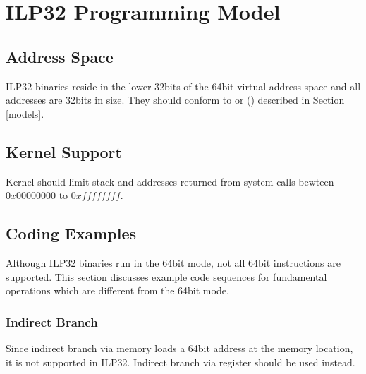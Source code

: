 \chapter{ILP32 Programming Model\label{ilp32}}

\section{Address Space}

\xARCH ILP32 binaries reside in the lower 32bits of the 64bit virtual
address space and all addresses are 32bits in size.  They should conform
to  or
 ()
described in Section \ref{models}.

\section{Kernel Support}
Kernel should limit stack and addresses returned from system calls
bewteen $0x00000000$ to $0xffffffff$.

\section{Coding Examples}

Although ILP32 binaries run in the 64bit mode, not all 64bit instructions
are supported. This section discusses example code sequences for
fundamental operations which are different from the 64bit mode.

\subsection{Indirect Branch}

Since indirect branch via memory loads a 64bit address at the memory
location, it is not supported in ILP32.  Indirect branch via register
should be used instead.

